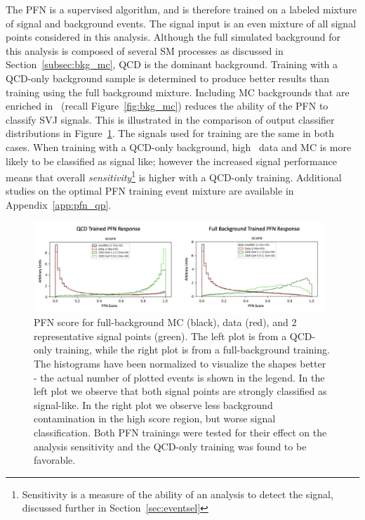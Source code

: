 The PFN is a supervised algorithm, and is therefore trained on a labeled mixture of signal and background events. The signal input is an even mixture of all signal points considered in this analysis. Although the full simulated background for this analysis is composed of several SM processes as discussed in Section~\ref{subsec:bkg_mc}, QCD is the dominant background. Training with a QCD-only background sample is determined to produce better results than training using the full background mixture. Including MC backgrounds that are enriched in \met~(recall Figure~\ref{fig:bkg_mc}) reduces the ability of the PFN to classify SVJ signals. This is illustrated in the comparison of output classifier distributions in Figure~\ref{fig:pfn_MC_training_mixture}. The signals used for training are the same in both cases. When training with a QCD-only background, high \met~data and MC is more likely to be classified as signal like; however the increased signal performance means that overall \textit{sensitivity}\footnote{Sensitivity is a measure of the ability of an analysis to detect the signal, discussed further in Section~\ref{sec:eventsel}} is higher with a QCD-only training. Additional studies on the optimal PFN training event mixture are available in Appendix~\ref{app:pfn_qp}. \par

\begin{figure}[!htbp]
\centering
   \includegraphics[width=0.98\textwidth]{figures/ml/pfn_MC_training_mixture}
    \caption{PFN score for full-background MC (black), data (red), and 2 representative signal points (green). The left plot is from a QCD-only training, while the right plot is from a full-background training. The histograms have been normalized to visualize the shapes better - the actual number of plotted events is shown in the legend. In the left plot we observe that both signal points are strongly classified as signal-like. In the right plot we observe less background contamination in the high score region, but worse signal classification. Both PFN trainings were tested for their effect on the analysis sensitivity and the QCD-only training was found to be favorable. 
    \label{fig:pfn_MC_training_mixture}}
\end{figure}

